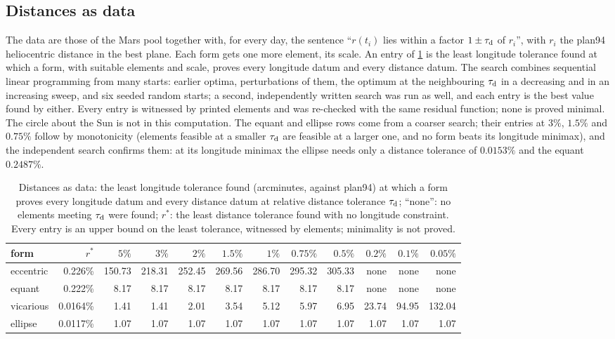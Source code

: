 \subsection{Distances as data}\label{sec:kepler:distdetails}

The data are those of the Mars pool together with, for every day, the sentence ``$r(t_i)$ lies within a factor $1\pm\tau_{\rm d}$ of $r_i$'', with $r_i$ the plan94 heliocentric distance in the best plane. Each form gets one more element, its scale. An entry of \cref{tab:kepler:distances} is the least longitude tolerance found at which a form, with suitable elements and scale, proves every longitude datum and every distance datum. The search combines sequential linear programming from many starts: earlier optima, perturbations of them, the optimum at the neighbouring $\tau_{\rm d}$ in a decreasing and in an increasing sweep, and six seeded random starts; a second, independently written search was run as well, and each entry is the best value found by either. Every entry is witnessed by printed elements and was re-checked with the same residual function; none is proved minimal. The circle about the Sun is not in this computation. The equant and ellipse rows come from a coarser search; their entries at $3\%$, $1.5\%$ and $0.75\%$ follow by monotonicity (elements feasible at a smaller $\tau_{\rm d}$ are feasible at a larger one, and no form beats its longitude minimax), and the independent search confirms them: at its longitude minimax the ellipse needs only a distance tolerance of $0.0153\%$ and the equant $0.2487\%$.

\begin{table}[ht]
\centering\small
\caption{Distances as data: the least longitude tolerance found (arcminutes, against plan94) at which a form proves every longitude datum and every distance datum at relative distance tolerance $\tau_{\rm d}$; ``none'': no elements meeting $\tau_{\rm d}$ were found; $r^*$: the least distance tolerance found with no longitude constraint. Every entry is an upper bound on the least tolerance, witnessed by elements; minimality is not proved.}\label{tab:kepler:distances}
\setlength{\tabcolsep}{4pt}
\begin{tabular}{@{}lrrrrrrrrrrr@{}}
\toprule
form & $r^*$ & $5\%$ & $3\%$ & $2\%$ & $1.5\%$ & $1\%$ & $0.75\%$ & $0.5\%$ & $0.2\%$ & $0.1\%$ & $0.05\%$\\
\midrule
eccentric & 0.226\% & 150.73 & 218.31 & 252.45 & 269.56 & 286.70 & 295.32 & 305.33 & none & none & none\\
equant & 0.222\% & 8.17 & 8.17 & 8.17 & 8.17 & 8.17 & 8.17 & 8.17 & none & none & none\\
vicarious & 0.0164\% & 1.41 & 1.41 & 2.01 & 3.54 & 5.12 & 5.97 & 6.95 & 23.74 & 94.95 & 132.04\\
ellipse & 0.0117\% & 1.07 & 1.07 & 1.07 & 1.07 & 1.07 & 1.07 & 1.07 & 1.07 & 1.07 & 1.07\\
\bottomrule
\end{tabular}
\end{table}


